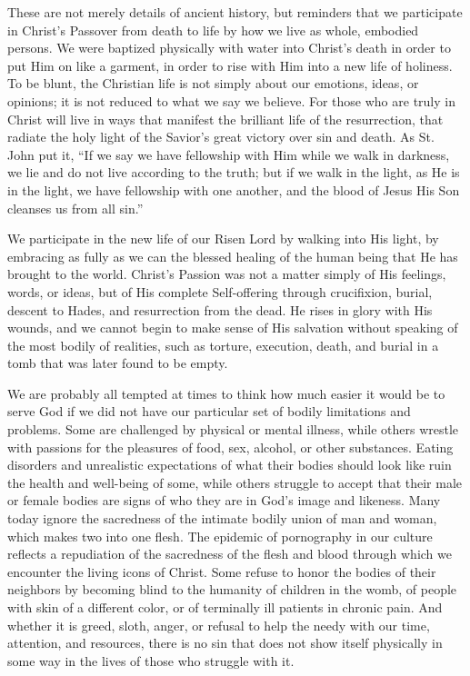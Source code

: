\documentclass[twoside, letterpaper, 12pt]{report}
\begin{document}
\begin{maybetwocolumns}
These are not merely details of ancient history, but reminders that we participate in Christ’s
Passover from death to life by how we live as whole, embodied persons. We were baptized
physically with water into Christ’s death in order to put Him on like a garment, in order to rise
with Him into a new life of holiness. To be blunt, the Christian life is not simply about our
emotions, ideas, or opinions; it is not reduced to what we say we believe. For those who are truly
in Christ will live in ways that manifest the brilliant life of the resurrection, that radiate the holy
light of the Savior’s great victory over sin and death. As St. John put it, “If we say we have
fellowship with Him while we walk in darkness, we lie and do not live according to the truth; but
if we walk in the light, as He is in the light, we have fellowship with one another, and the blood of
Jesus His Son cleanses us from all sin.”

We participate in the new life of our Risen Lord by walking into His light, by embracing as fully
as we can the blessed healing of the human being that He has brought to the world. Christ’s
Passion was not a matter simply of His feelings, words, or ideas, but of His complete Self-offering
through crucifixion, burial, descent to Hades, and resurrection from the dead. He rises in glory
with His wounds, and we cannot begin to make sense of His salvation without speaking of the
most bodily of realities, such as torture, execution, death, and burial in a tomb that was later found
to be empty.

We are probably all tempted at times to think how much easier it would be to serve God if we did
not have our particular set of bodily limitations and problems. Some are challenged by physical
or mental illness, while others wrestle with passions for the pleasures of food, sex, alcohol, or other
substances. Eating disorders and unrealistic expectations of what their bodies should look like
ruin the health and well-being of some, while others struggle to accept that their male or female
bodies are signs of who they are in God’s image and likeness. Many today ignore the sacredness
of the intimate bodily union of man and woman, which makes two into one flesh. The epidemic
of pornography in our culture reflects a repudiation of the sacredness of the flesh and blood through
which we encounter the living icons of Christ. Some refuse to honor the bodies of their neighbors
by becoming blind to the humanity of children in the womb, of people with skin of a different
color, or of terminally ill patients in chronic pain. And whether it is greed, sloth, anger, or refusal
to help the needy with our time, attention, and resources, there is no sin that does not show itself
physically in some way in the lives of those who struggle with it.


\end{maybetwocolumns}
\end{document}
